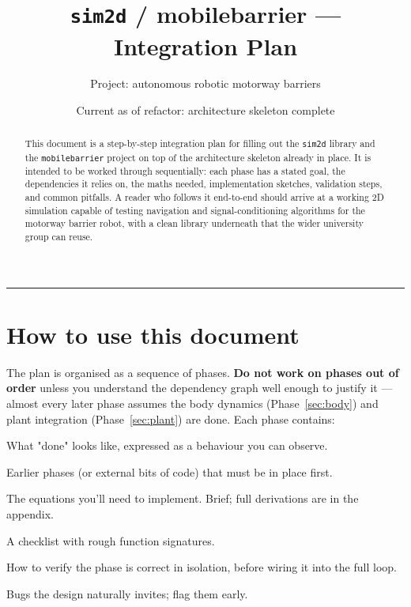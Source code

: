 \documentclass[11pt,a4paper]{article}
\title{\texttt{sim2d} / mobilebarrier --- Integration Plan}
\author{Project: autonomous robotic motorway barriers}
\date{Current as of refactor: architecture skeleton complete}
\newcommand{\code}[1]{\texttt{\small #1}}
\begin{document}
\maketitle

\begin{abstract}
\noindent
This document is a step-by-step integration plan for filling out the
\code{sim2d} library and the \code{mobilebarrier} project on top of the
architecture skeleton already in place. It is intended to be worked through
sequentially: each phase has a stated goal, the dependencies it relies on,
the maths needed, implementation sketches, validation steps, and common
pitfalls. A reader who follows it end-to-end should arrive at a working 2D
simulation capable of testing navigation and signal-conditioning algorithms
for the motorway barrier robot, with a clean library underneath that the
wider university group can reuse.
\end{abstract}

\tableofcontents
\vspace{1em}\hrule\vspace{1em}

\section{How to use this document}

The plan is organised as a sequence of phases. \textbf{Do not work on phases
out of order} unless you understand the dependency graph well enough to
justify it --- almost every later phase assumes the body dynamics
(Phase~\ref{sec:body}) and plant integration (Phase~\ref{sec:plant}) are
done. Each phase contains:

\begin{description}[leftmargin=1.5em, style=nextline]
    \item[Goal.] What "done" looks like, expressed as a behaviour you can
        observe.
    \item[Depends on.] Earlier phases (or external bits of code) that must
        be in place first.
    \item[Maths.] The equations you'll need to implement. Brief; full
        derivations are in the appendix.
    \item[Implementation tasks.] A checklist with rough function
        signatures.
    \item[Validation.] How to verify the phase is correct in isolation,
        before wiring it into the full loop.
    \item[Pitfalls.] Bugs the design naturally invites; flag them early.
\end{description}
\end{document}
